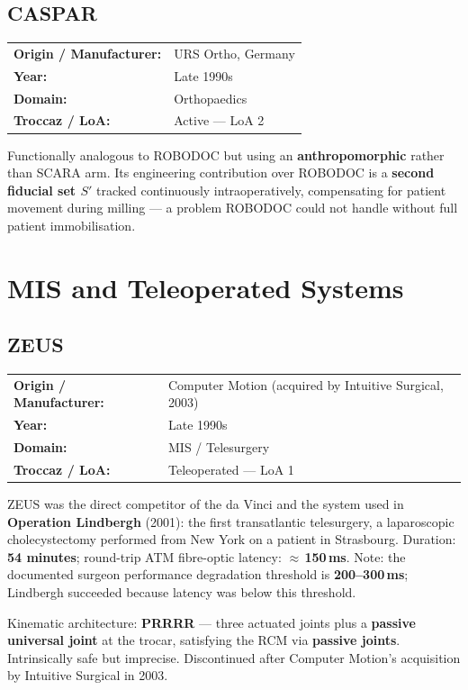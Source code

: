 \documentclass[11pt,a4paper,twoside]{report}
\makeatletter
\newcommand{\robotmeta}[4]{%
  \noindent\begin{tabular}{@{}ll@{}}
    \textbf{Origin / Manufacturer:} & #1 \\
    \textbf{Year:}                  & #2 \\
    \textbf{Domain:}                & #3 \\
    \textbf{Troccaz / LoA:}         & #4 \\
  \end{tabular}\par\smallskip\noindent}
\makeatother
\begin{document}
\section{CASPAR}
\robotmeta{URS Ortho, Germany}{Late 1990s}{Orthopaedics}{Active — LoA 2}
Functionally analogous to ROBODOC but using an \textbf{anthropomorphic} rather than SCARA arm. Its engineering contribution over ROBODOC is a \textbf{second fiducial set $S'$} tracked continuously intraoperatively, compensating for patient movement during milling — a problem ROBODOC could not handle without full patient immobilisation.

\chapter{MIS and Teleoperated Systems}

\section{ZEUS}
\robotmeta{Computer Motion (acquired by Intuitive Surgical, 2003)}{Late 1990s}{MIS / Telesurgery}{Teleoperated — LoA 1}
ZEUS was the direct competitor of the da Vinci and the system used in \textbf{Operation Lindbergh} (2001): the first transatlantic telesurgery, a laparoscopic cholecystectomy performed from New York on a patient in Strasbourg. Duration: \textbf{54 minutes}; round-trip ATM fibre-optic latency: $\approx$\,\textbf{150\,ms}. Note: the documented surgeon performance degradation threshold is \textbf{200--300\,ms}; Lindbergh succeeded because latency was below this threshold.

Kinematic architecture: \textbf{PRRRR} — three actuated joints plus a \textbf{passive universal joint} at the trocar, satisfying the RCM via \textbf{passive joints}. Intrinsically safe but imprecise. Discontinued after Computer Motion's acquisition by Intuitive Surgical in 2003.
\end{document}
